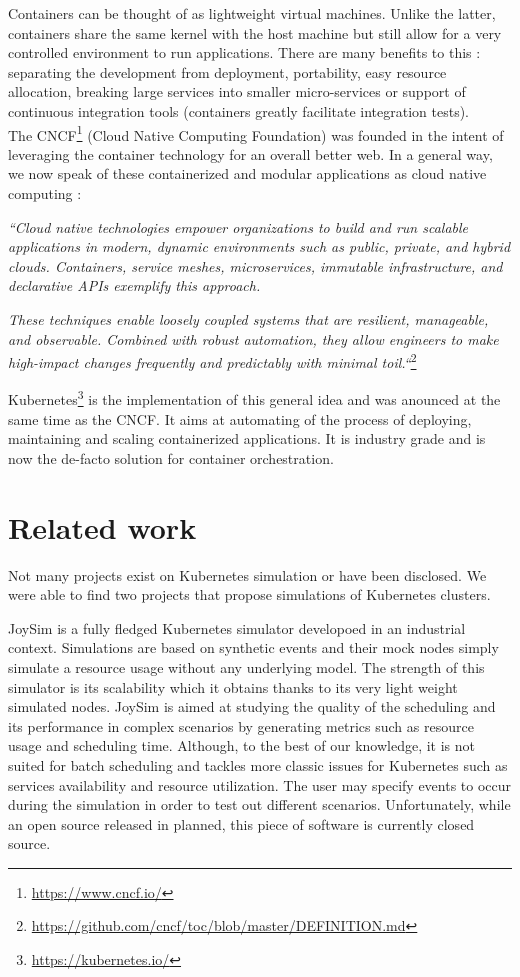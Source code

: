 Containers can be thought of as lightweight virtual machines. Unlike the
latter, containers share the same kernel with the host machine but still allow
for a very controlled environment to run applications. There are many
benefits to this : separating the development from deployment, portability,
easy resource allocation, breaking large services into smaller micro-services
or support of continuous integration tools (containers greatly facilitate
integration tests).\\

The CNCF\footnote{\url{https://www.cncf.io/}} (Cloud Native Computing
Foundation) was founded in the intent of leveraging the container technology
for an overall better web. In a general way, we now speak of these
containerized and modular applications as cloud native computing :

\textit{``Cloud native technologies empower organizations to build and run
	scalable applications in modern, dynamic environments such as public,
	private, and hybrid clouds. Containers, service meshes, microservices,
	immutable infrastructure, and declarative APIs exemplify this
	approach.}

\textit{These techniques enable loosely coupled systems that
	are resilient, manageable, and observable.  Combined with robust
	automation, they allow engineers to make high-impact changes frequently
	and predictably with minimal toil.``}\footnote{\url{https://github.com/cncf/toc/blob/master/DEFINITION.md}}

Kubernetes\footnote{\url{https://kubernetes.io/}} is the implementation of this
general idea and was anounced at the same time as the CNCF. It aims at
automating of the process of deploying, maintaining and scaling containerized
applications. It is industry grade and is now the de-facto solution for
container orchestration.

\section{Related work}

Not many projects exist on Kubernetes simulation or have been disclosed. We
were able to find two projects that propose simulations of Kubernetes clusters.

JoySim \cite{joysim} is a fully fledged Kubernetes simulator developoed in an
industrial context. Simulations are based on synthetic events and their mock
nodes simply simulate a resource usage without any underlying model. The
strength of this simulator is its scalability which it obtains thanks to its
very light weight simulated nodes. JoySim is aimed at studying the quality of
the scheduling and its performance in complex scenarios by generating metrics
such as resource usage and scheduling time. Although, to the best of our
knowledge, it is not suited for batch scheduling and tackles more classic
issues for Kubernetes such as services availability and resource utilization.
The user may specify events to occur during the simulation in order to test out
different scenarios. Unfortunately, while an open source released in planned,
this piece of software is currently closed source.

